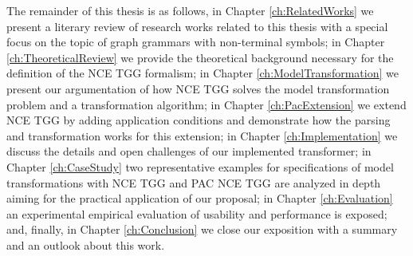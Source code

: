 The remainder of this thesis is as follows, in Chapter \ref{ch:RelatedWorks} we present a literary review of research works related to this thesis with a special focus on the topic of graph grammars with non-terminal symbols; in Chapter \ref{ch:TheoreticalReview} we provide the theoretical background necessary for the definition of the NCE TGG formalism; in Chapter \ref{ch:ModelTransformation} we present our argumentation of how NCE TGG solves the model transformation problem and a transformation algorithm; in Chapter \ref{ch:PacExtension} we extend NCE TGG by adding application conditions and demonstrate how the parsing and transformation works for this extension; in Chapter \ref{ch:Implementation} we discuss the details and open challenges of our implemented transformer; in Chapter \ref{ch:CaseStudy} two representative examples for specifications of model transformations with NCE TGG and PAC NCE TGG are analyzed in depth aiming for the practical application of our proposal; in Chapter \ref{ch:Evaluation} an experimental empirical evaluation of usability and performance is exposed; and, finally, in Chapter \ref{ch:Conclusion} we close our exposition with a summary and an outlook about this work.
